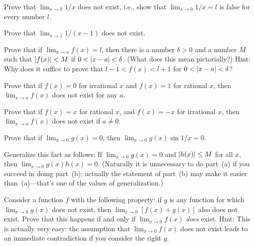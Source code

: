 \begin{letters}
\item Prove that $\lim_{x\to 0}1/x$ does not exist, i.e., show that
$\lim_{x\to 0}1/x=l$ is false for every number $l$.
\item Prove that $\lim_{x\to 1}1/(x-1)$ does not exist.
\end{letters}

Prove that if $\lim_{x\to a}f(x)=l$, then there is a number $\delta>0$ and a
number $M$ such that $\lvert f(x)\rvert<M$ if $0<\lvert x-a\rvert<\delta$. (What does this
mean pictorially?) Hint: Why does it suffice to prove that
$l-1<f(x)<l+1$ for $0<\lvert x-a\rvert<\delta$?

Prove that if $f(x)=0$ for irrational $x$ and $f(x)=1$ for rational $x$, then
$\lim_{x\to a}f(x)$ does not exist for any $a$.

Prove that if $f(x)=x$ for rational $x$, and $f(x)=-x$ for irrational $x$, then
$\lim_{x\to a}f(x)$ does not exist if $a\neq 0$.

\begin{letters}
\item Prove that if $\lim_{x\to 0}g(x)=0$, then
$\lim_{x\to 0}g(x)\sin 1/x=0$.
\item Generalize this fact as follows: If $\lim_{x\to 0}g(x)=0$ and
$\lvert h(x)\rvert\leq M$ for all $x$, then $\lim_{x\to 0}g(x)h(x)=0$. (Naturally it
is unnecessary to do part~(a) if you succeed in doing part~(b); actually the
statement of part~(b) may make it easier than~(a)---that's one of the values
of generalization.)
\end{letters}

Consider a function $f$ with the following property: if $g$ is any function
for which $\lim_{x\to 0}g(x)$ does not exist, then
$\lim_{x\to 0}[f(x)+g(x)]$ also does not exist. Prove that this happens if and
only if $\lim_{x\to 0}f(x)$ \emph{does} exist. Hint: This is actually very
easy: the assumption that $\lim_{x\to 0}f(x)$ does not exist leads to an
immediate contradiction if you consider the right $g$.

